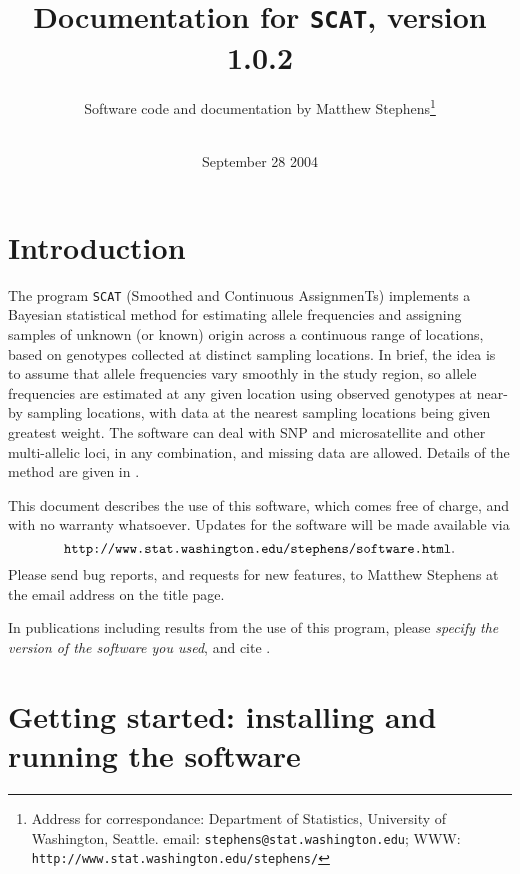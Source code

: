 \documentclass[11pt,titlepage,times,letterpaper]{article}
\def\SCAT{{\tt SCAT} }
\begin{document}
\title{Documentation for {\tt SCAT}, version 1.0.2}

\author{
Software code and documentation by Matthew Stephens\footnote{Address for correspondance:               Department of Statistics, University of Washington, Seattle.
  email: {\tt stephens@stat.washington.edu};
WWW: {\tt http://www.stat.washington.edu/stephens/}}\\
\\
}

\date{September 28 2004}

\maketitle

\tableofcontents
\vfil\eject
\section{Introduction}

The program \SCAT (Smoothed and Continuous AssignmenTs)
implements a Bayesian statistical method for estimating allele
frequencies and assigning samples of unknown (or known) origin across
a continuous range of locations, based on genotypes collected at
distinct sampling locations.  In brief, the idea is to assume that allele
frequencies vary smoothly in the study region, so allele frequencies
are estimated at any given location using observed genotypes at
near-by sampling locations, with data at the nearest sampling
locations being given greatest weight.  The software can deal with SNP
and microsatellite and other multi-allelic loci, in any combination,
and missing data are allowed. Details of the method are given in
\cite{wasser.etal.04}.

This document describes the use of this software, which comes free of
charge, and with no warranty whatsoever.  Updates for the software
will be made available via
$$\text{{\tt http://www.stat.washington.edu/stephens/software.html}.}$$
Please send bug reports, and requests for new features, to Matthew Stephens
at the email address on the title page.

In publications including results from the use of this program, please
{\it specify the version of the software you used}, and cite
\cite{wasser.etal.04}.




\section{Getting started: installing and running the software}
\label{started}
\end{document}
